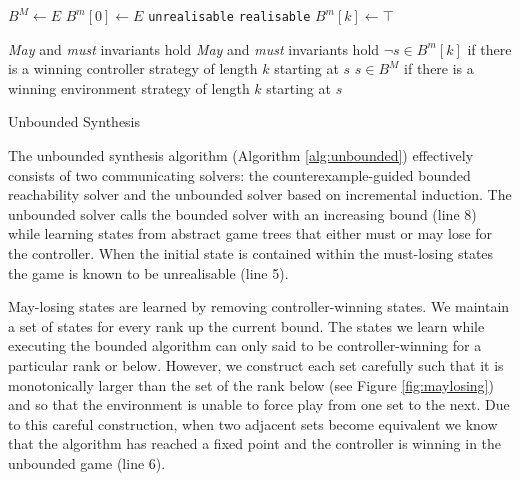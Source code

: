 \documentclass{llncs}
\begin{document}
\begin{algorithm}[h]
    \begin{algorithmic}[1]
            \State $B^M \gets E$
            \State $B^m[0] \gets E$
                    \Return \texttt{unrealisable} 
                \EndIIf
                    \Return \texttt{realisable} 
                \EndIIf
                \State $B^m[k] \gets \top$
                \State {}
            \EndFor
        \EndFunction
    \end{algorithmic}

    \begin{algorithmic}
        \Require \emph{May} and \emph{must} invariants hold
        \Ensure \emph{May} and \emph{must} invariants hold
        \Ensure $\lnot s \in B^m[k]$ if there is a winning controller strategy of length $k$ starting at $s$
        \Ensure $s \in B^M$ if there is a winning environment strategy of length $k$ starting at $s$
            \State \Return {}
        \EndFunction
    \end{algorithmic}
    \caption{Unbounded Synthesis}
    \label{alg:unbounded}
\end{algorithm}

The unbounded synthesis algorithm (Algorithm \ref{alg:unbounded}) effectively
consists of two communicating solvers: the counterexample-guided bounded
reachability solver and the unbounded solver based on incremental induction.
The unbounded solver calls the bounded solver with an increasing bound (line 8)
while learning states from abstract game trees that either must or may lose for
the controller. When the initial state is contained within the must-losing
states the game is known to be unrealisable (line 5).

May-losing states are learned by removing controller-winning states. We
maintain a set of states for every rank up the current bound. The states we
learn while executing the bounded algorithm can only said to be
controller-winning for a particular rank or below. However, we construct each
set carefully such that it is monotonically larger than the set of the rank
below (see Figure \ref{fig:maylosing}) and so that the environment is unable to
force play from one set to the next. Due to this careful construction, when two
adjacent sets become equivalent we know that the algorithm has reached a fixed
point and the controller is winning in the unbounded game (line 6).
\end{document}
